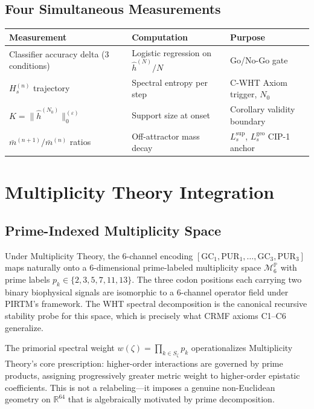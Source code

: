 \documentclass[12pt,letterpaper]{article}
\theoremstyle{definition}
\theoremstyle{plain}
\theoremstyle{remark}
\newcommand{\hhat}{\hat{h}}
\newcommand{\mbar}{\bar{m}}
\newcommand{\Lsup}{L_s^{\sup}}
\newcommand{\Lgeo}{L_s^{\mathrm{geo}}}
\begin{document}
\subsection{Four Simultaneous Measurements}

\begin{center}
\begin{tabular}{lll}
\toprule
Measurement & Computation & Purpose \\
\midrule
Classifier accuracy delta (3 conditions) & Logistic regression on $\hhat^{(N)}/N$ & Go/No-Go gate \\
$H_s^{(n)}$ trajectory & Spectral entropy per step & C-WHT Axiom trigger, $N_0$ \\
$K = \|\hhat^{(N_0)}\|_0^{(\varepsilon)}$ & Support size at onset & Corollary validity boundary \\
$\mbar^{(n+1)}/\mbar^{(n)}$ ratios & Off-attractor mass decay & $\Lsup$, $\Lgeo$ CIP-1 anchor \\
\bottomrule
\end{tabular}
\end{center}

\section{Multiplicity Theory Integration}

\subsection{Prime-Indexed Multiplicity Space}

Under Multiplicity Theory, the 6-channel encoding $[\mathrm{GC}_1, \mathrm{PUR}_1, \ldots, \mathrm{GC}_3, \mathrm{PUR}_3]$ maps naturally onto a 6-dimensional prime-labeled multiplicity space $\mathcal{M}_6^{\mathbb{P}}$ with prime labels $p_k \in \{2,3,5,7,11,13\}$. The three codon positions each carrying two binary biophysical signals are isomorphic to a 6-channel operator field under PIRTM's framework. The WHT spectral decomposition is the canonical recursive stability probe for this space, which is precisely what CRMF axioms C1--C6 generalize.

The primorial spectral weight $w(\zeta) = \prod_{k \in S_\zeta} p_k$ operationalizes Multiplicity Theory's core prescription: higher-order interactions are governed by prime products, assigning progressively greater metric weight to higher-order epistatic coefficients. This is not a relabeling---it imposes a genuine non-Euclidean geometry on $\mathbb{R}^{64}$ that is algebraically motivated by prime decomposition.
\end{document}
